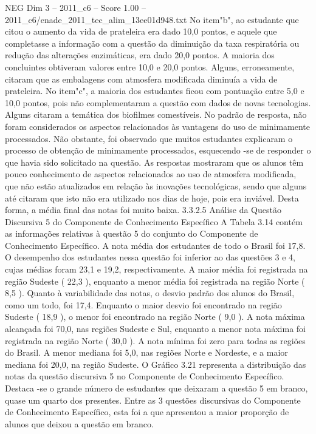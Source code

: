 \begin{textsample}{NEG Dim 3 – 2011\_c6 – Score 1.00 – 2011\_c6/enade\_2011\_tec\_alim\_13ee01d948.txt}
No item"b", ao estudante que citou o aumento da vida de prateleira era dado 10,0 pontos, e aquele que completasse a informação com a questão da diminuição da taxa respiratória ou redução das alterações enzimáticas, era dado 20,0 pontos.
A maioria dos concluintes obtiveram valores entre 10,0 e 20,0 pontos.
Alguns, erroneamente, citaram que as embalagens com atmosfera modificada diminuía a vida de prateleira.
No item"c", a maioria dos estudantes ficou com pontuação entre 5,0 e 10,0 pontos, pois não complementaram a questão com dados de novas tecnologias.
Alguns citaram a temática dos biofilmes comestíveis.
No padrão de resposta, não foram considerados os aspectos relacionados às vantagens do uso de minimamente processados.
Não obstante, foi observado que muitos estudantes explicaram o processo de obtenção de minimamente processados, esquecendo -se de responder o que havia sido solicitado na questão.
As respostas mostraram que os alunos têm pouco conhecimento de aspectos relacionados ao uso de atmosfera modificada, que não estão atualizados em relação às inovações tecnológicas, sendo que alguns até citaram que isto não era utilizado nos dias de hoje, pois era inviável.
Desta forma, a média final das notas foi muito baixa. 3.3.2.5 Análise da Questão Discursiva 5 do Componente de Conhecimento Específico A Tabela 3.14 contém as informações relativas à questão 5 do conjunto do Componente de Conhecimento Específico.
A nota média dos estudantes de todo o Brasil foi 17,8.
O desempenho dos estudantes nessa questão foi inferior ao das questões 3 e 4, cujas médias foram 23,1 e 19,2, respectivamente.
A maior média foi registrada na região Sudeste ( 22,3 ), enquanto a menor média foi registrada na região Norte ( 8,5 ).
Quanto à variabilidade das notas, o desvio padrão dos alunos do Brasil, como um todo, foi 17,4.
Enquanto o maior desvio foi encontrado na região Sudeste ( 18,9 ), o menor foi encontrado na região Norte ( 9,0 ).
A nota máxima alcançada foi 70,0, nas regiões Sudeste e Sul, enquanto a menor nota máxima foi registrada na região Norte ( 30,0 ).
A nota mínima foi zero para todas as regiões do Brasil.
A menor mediana foi 5,0, nas regiões Norte e Nordeste, e a maior mediana foi 20,0, na região Sudeste.
O Gráfico 3.21 representa a distribuição das notas da questão discursiva 5 no Componente de Conhecimento Específico.
Destaca -se o grande número de estudantes que deixaram a questão 5 em branco, quase um quarto dos presentes.
Entre as 3 questões discursivas do Componente de Conhecimento Específico, esta foi a que apresentou a maior proporção de alunos que deixou a questão em branco.

\end{textsample}
